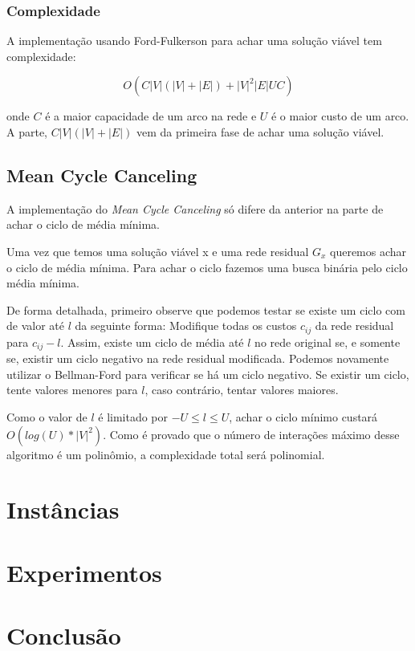 \documentclass[12pt]{article}
\begin{document}
\subsubsection{Complexidade}
A implementação usando Ford-Fulkerson para achar uma solução viável tem complexidade:

$$
	O (C|V|(|V| + |E|) + |V|^2|E| UC)
$$ 

onde $C$ é a maior capacidade de um arco na rede e $U$ é o maior custo de um arco. 
A parte, $C |V| (|V| + |E|)$ vem da primeira fase de achar uma solução viável.

\subsection{Mean Cycle Canceling}

A implementação do \emph{Mean Cycle Canceling} só difere da anterior na parte de achar o
ciclo de média mínima. 

Uma vez que temos uma solução viável x e uma rede residual $G_x$ queremos
achar o ciclo de média mínima. Para achar o ciclo fazemos uma busca binária 
pelo ciclo média mínima.

De forma detalhada, primeiro observe que podemos
testar se existe um ciclo com de valor até $l$ da seguinte forma: Modifique
todas os custos $c_{ij}$ da rede residual para $c_{ij} - l$. Assim, existe um ciclo de média até $l$
no rede original se, e somente se, existir um ciclo negativo na rede residual modificada.
Podemos novamente utilizar o Bellman-Ford para verificar se há um ciclo negativo. Se existir 
um ciclo, tente valores menores para $l$, caso contrário, tentar valores maiores.  
 
Como o valor de $l$ é limitado por $-U \le l \le U$, achar o ciclo mínimo custará 
$O (log(U) * |V|^2)$. Como é provado que o número de interações máximo desse algoritmo
é um polinômio, a complexidade total será polinomial. 

\section{Instâncias}

\section{Experimentos}

\section{Conclusão}





\end{document}
